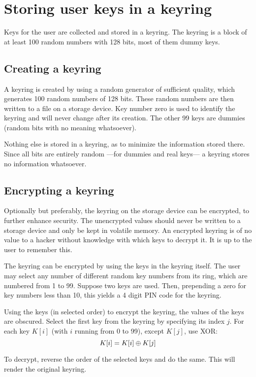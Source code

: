\section{Storing user keys in a keyring}
\label{sec:keyring}
Keys for the user are collected and stored in a keyring.
The keyring is a block of at least 100 random numbers with 128 bits, most of them dummy keys.

\subsection{Creating a keyring}
A keyring is created by using a random generator of sufficient quality,
which generates 100 random numbers of 128 bits.
These random numbers are then written to a file on a storage device.
Key number zero is used to identify the keyring and will never change after its creation.
The other 99 keys are dummies (random bits with no meaning whatsoever).
\par
Nothing else is stored in a keyring, as to minimize the information stored there.
Since all bits are entirely random%
---for dummies and real keys---%
a keyring stores no information whatsoever.

\subsection{Encrypting a keyring}
Optionally but preferably,
the keyring on the storage device can be encrypted, to further enhance security.
The unencrypted values should never be written to a storage device and only be kept in volatile memory.
An encrypted keyring is of no value to a hacker without knowledge with which keys to decrypt it.
It is up to the user to remember this.
\par
The keyring can be encrypted by using the keys in the keyring itself.
The user may select any number of different random key numbers from its ring,
which are numbered from 1 to 99.
Suppose two keys are used.
Then,
prepending a zero for key numbers less than 10,
this yields a 4 digit PIN code for the keyring.
\par
Using the keys (in selected order) to encrypt the keyring, the values of the keys are obscured.
Select the first key from the keyring by specifying its index $j$.
For each key $K[i]$ (with $i$ running from 0 to 99), except $K[j]$, use XOR:
\[K[i]=K[i]\oplus K[j]\]
\par
To decrypt, reverse the order of the selected keys and do the same.
This will render the original keyring.


